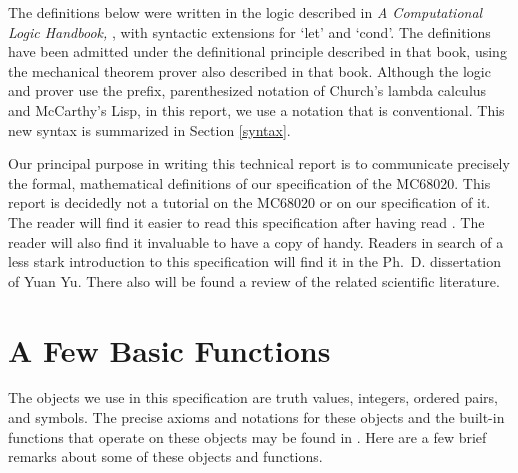 The definitions below were written in the logic described in {\em A
Computational Logic Handbook,} \cite{BM-88}, with syntactic extensions
for `let' and `cond'.  The definitions have been admitted under the
definitional principle described in that book, using the mechanical
theorem prover also described in that book.  Although the logic and
prover use the prefix, parenthesized notation of Church's lambda
calculus and McCarthy's Lisp, in this report, we use a notation that
is conventional.  This new syntax is summarized in Section \ref{syntax}.

Our principal purpose in writing this technical report is to
communicate precisely the formal, mathematical definitions of our
specification of the MC68020.  This report is decidedly not a tutorial
on the MC68020 or on our specification of it.  The reader will find it
easier to read this specification after having read
\cite{Boyer-Yu-91}.  The reader will also find it invaluable to have a
copy of \cite{m20} handy.  Readers in search of a less stark
introduction to this specification will find it in the Ph.~D.
dissertation of Yuan Yu.  There also will be found a review of the
related scientific literature.

\section{A Few Basic Functions}

The objects we use in this specification are truth values, integers, ordered
pairs, and symbols.  The precise axioms and notations for these objects and the
built-in functions that operate on these objects may be found in \cite{BM-88}.
Here are a few brief remarks about some of these objects and functions.


